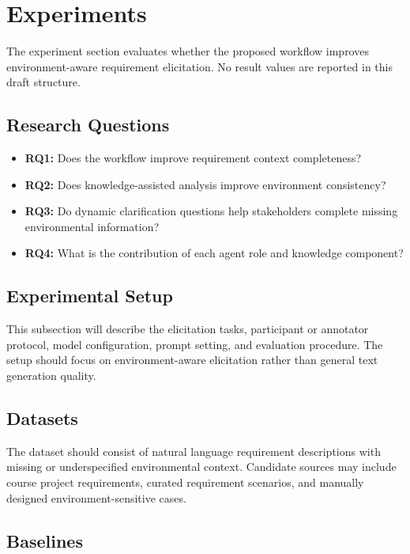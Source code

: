 \section{Experiments}
\label{experiments}

The experiment section evaluates whether the proposed workflow improves environment-aware requirement elicitation.
No result values are reported in this draft structure.

\subsection{Research Questions}
\label{exp:rqs}

\begin{itemize}[leftmargin=*]
  \item \textbf{RQ1:} Does the workflow improve requirement context completeness?
  \item \textbf{RQ2:} Does knowledge-assisted analysis improve environment consistency?
  \item \textbf{RQ3:} Do dynamic clarification questions help stakeholders complete missing environmental information?
  \item \textbf{RQ4:} What is the contribution of each agent role and knowledge component?
\end{itemize}

\subsection{Experimental Setup}
\label{exp:setup}

This subsection will describe the elicitation tasks, participant or annotator protocol, model configuration, prompt setting, and evaluation procedure.
The setup should focus on environment-aware elicitation rather than general text generation quality.

\subsection{Datasets}
\label{exp:datasets}

The dataset should consist of natural language requirement descriptions with missing or underspecified environmental context.
Candidate sources may include course project requirements, curated requirement scenarios, and manually designed environment-sensitive cases.

\subsection{Baselines}
\label{exp:baselines}

